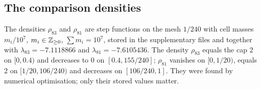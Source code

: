 \subsection{The comparison densities}\label{app:decay-certificates}

The densities $\rho_{83}$ and $\rho_{81}$ are step functions on the mesh $1/240$ with cell masses
$m_i/10^7$, $m_i\in\mathbb{Z}_{\ge0}$, $\sum m_i=10^7$, stored in the supplementary files
 and
 together with
$\lambda_{83}=-7.1118866$ and $\lambda_{81}=-7.6105436$. The density $\rho_{83}$ equals the cap $2$
on $[0,0.4)$ and decreases to $0$ on $[0.4,155/240]$; $\rho_{81}$ vanishes on $[0,1/20)$, equals
$2$ on $[1/20,106/240)$ and decreases on $[106/240,1]$. They were found by numerical optimisation;
only their stored values matter.

